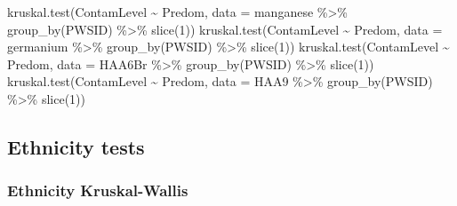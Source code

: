 \documentclass[
  letterpaper,
  DIV=11,
  numbers=noendperiod]{scrartcl}
\newenvironment{Shaded}{\begin{snugshade}}{\end{snugshade}}
\newcommand{\AttributeTok}[1]{\textcolor[rgb]{0.40,0.45,0.13}{#1}}
\newcommand{\DecValTok}[1]{\textcolor[rgb]{0.68,0.00,0.00}{#1}}
\newcommand{\FunctionTok}[1]{\textcolor[rgb]{0.28,0.35,0.67}{#1}}
\newcommand{\NormalTok}[1]{\textcolor[rgb]{0.00,0.23,0.31}{#1}}
\newcommand{\SpecialCharTok}[1]{\textcolor[rgb]{0.37,0.37,0.37}{#1}}
\begin{document}
\begin{Shaded}
\begin{Highlighting}[]
\FunctionTok{kruskal.test}\NormalTok{(ContamLevel }\SpecialCharTok{\textasciitilde{}}\NormalTok{ Predom, }\AttributeTok{data =}\NormalTok{ manganese }\SpecialCharTok{\%\textgreater{}\%} \FunctionTok{group\_by}\NormalTok{(PWSID) }\SpecialCharTok{\%\textgreater{}\%} \FunctionTok{slice}\NormalTok{(}\DecValTok{1}\NormalTok{))}
\FunctionTok{kruskal.test}\NormalTok{(ContamLevel }\SpecialCharTok{\textasciitilde{}}\NormalTok{ Predom, }\AttributeTok{data =}\NormalTok{ germanium }\SpecialCharTok{\%\textgreater{}\%} \FunctionTok{group\_by}\NormalTok{(PWSID) }\SpecialCharTok{\%\textgreater{}\%} \FunctionTok{slice}\NormalTok{(}\DecValTok{1}\NormalTok{))}
\FunctionTok{kruskal.test}\NormalTok{(ContamLevel }\SpecialCharTok{\textasciitilde{}}\NormalTok{ Predom, }\AttributeTok{data =}\NormalTok{ HAA6Br }\SpecialCharTok{\%\textgreater{}\%} \FunctionTok{group\_by}\NormalTok{(PWSID) }\SpecialCharTok{\%\textgreater{}\%} \FunctionTok{slice}\NormalTok{(}\DecValTok{1}\NormalTok{))}
\FunctionTok{kruskal.test}\NormalTok{(ContamLevel }\SpecialCharTok{\textasciitilde{}}\NormalTok{ Predom, }\AttributeTok{data =}\NormalTok{ HAA9 }\SpecialCharTok{\%\textgreater{}\%} \FunctionTok{group\_by}\NormalTok{(PWSID) }\SpecialCharTok{\%\textgreater{}\%} \FunctionTok{slice}\NormalTok{(}\DecValTok{1}\NormalTok{))}
\end{Highlighting}
\end{Shaded}

\hypertarget{ethnicity-tests}{%
\subsection{Ethnicity tests}\label{ethnicity-tests}}

\hypertarget{ethnicity-kruskal-wallis}{%
\subsubsection{Ethnicity
Kruskal-Wallis}\label{ethnicity-kruskal-wallis}}
\end{document}
